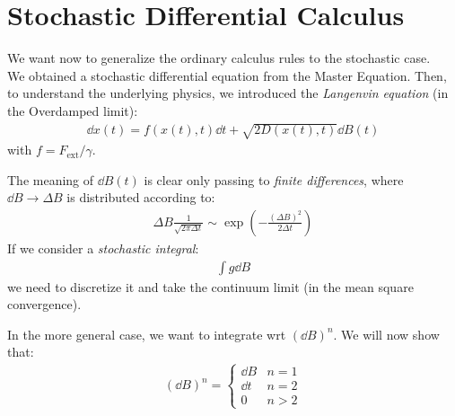 \documentclass[../template.tex]{subfiles}
\begin{document}
\section{Stochastic Differential Calculus}

We want now to generalize the ordinary calculus rules to the stochastic case.\\
We obtained a stochastic differential equation from the Master Equation. Then, to understand the underlying physics, we introduced the \textit{Langenvin equation} (in the Overdamped limit):
\begin{align*}
    \dd{x(t)} = f(x(t),t) \dd{t} + \sqrt{2D(x(t),t)} \dd{B(t)}
\end{align*} 
with $f = F_{\mathrm{ext} }/\gamma$.

The meaning of $\dd{B(t)}$ is clear only passing to \textit{finite differences}, where $\dd{B} \to \Delta B$ is distributed according to: 
\begin{align*}
    \Delta B \frac{1}{\sqrt{2 \pi \Delta t}} \sim \exp\left(-\frac{(\Delta B)^2}{2 \Delta t} \right)
\end{align*}  
If we consider a \textit{stochastic integral}:
\begin{align*}
    \int g \dd{B}
\end{align*} 
we need to discretize it and take the continuum limit (in the mean square convergence).

In the more general case, we want to integrate wrt $(\dd{B})^n$. We will now show that:
\begin{align*}
    (\dd{B})^n = \begin{cases}
        \dd{B} & n=1\\
        \dd{t} & n=2\\
        0 & n>2
    \end{cases}
\end{align*} 
\end{document}
